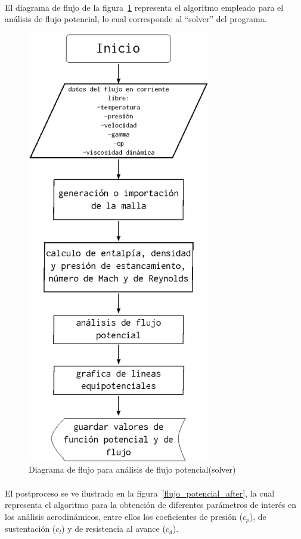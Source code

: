 \documentclass[letterpaper, openright, 12pt]{book}
\begin{document}
    \paragraph*{}
        El diagrama de flujo de la figura~\ref{flujo_potencial} representa el
        algoritmo empleado para el análisis de flujo potencial, lo cual
        corresponde al ``solver'' del programa.

    \begin{figure}[htbp!]
        \centering
        \includegraphics[keepaspectratio, width=80mm]{./Imagenes/flujo_potencial}
        \caption{Diagrama de flujo para análisis de flujo potencial(solver)}
        \label{flujo_potencial}
    \end{figure}

    \paragraph*{}
        El postproceso se ve ilustrado en la figura~\ref{flujo_potencial_after},
        la cual representa el algoritmo para la obtención de diferentes
        parámetros de interés en los análisis aerodinámicos, entre ellos los
        coeficientes de presión ($c_p$), de sustentación ($c_l$) y de
        resistencia al avance ($c_d$).
\end{document}
